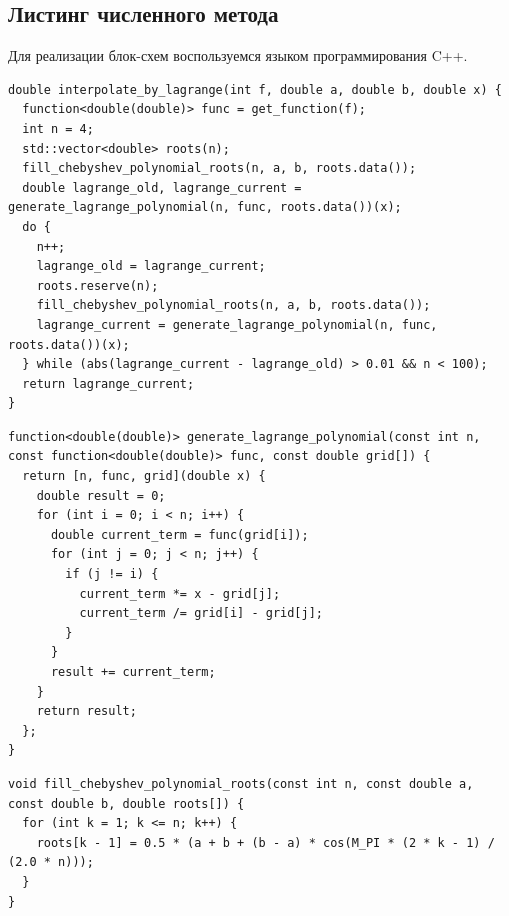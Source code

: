 \subsection{Листинг численного метода}

Для реализации блок-схем воспользуемся языком программирования C++.

\begin{lstlisting}[caption=Вычисление значения интерполирующей функции \( F(x) \) заданной точности.]
double interpolate_by_lagrange(int f, double a, double b, double x) {
  function<double(double)> func = get_function(f);
  int n = 4;
  std::vector<double> roots(n);
  fill_chebyshev_polynomial_roots(n, a, b, roots.data());
  double lagrange_old, lagrange_current = generate_lagrange_polynomial(n, func, roots.data())(x);
  do {
    n++;
    lagrange_old = lagrange_current;
    roots.reserve(n);
    fill_chebyshev_polynomial_roots(n, a, b, roots.data());
    lagrange_current = generate_lagrange_polynomial(n, func, roots.data())(x);
  } while (abs(lagrange_current - lagrange_old) > 0.01 && n < 100);
  return lagrange_current;
}
\end{lstlisting}

\begin{lstlisting}[caption=Построение интерполяционного многочлена в форме Лагранжа \( L_n(t) \).]
function<double(double)> generate_lagrange_polynomial(const int n, const function<double(double)> func, const double grid[]) {
  return [n, func, grid](double x) {
    double result = 0;
    for (int i = 0; i < n; i++) {
      double current_term = func(grid[i]);
      for (int j = 0; j < n; j++) {
        if (j != i) {
          current_term *= x - grid[j];
          current_term /= grid[i] - grid[j];
        }
      }
      result += current_term;
    }
    return result;
  };
}
\end{lstlisting}

\begin{lstlisting}[caption=Поиск корней многочлена Чебышёва первого рода \( T_n(t) \).]
void fill_chebyshev_polynomial_roots(const int n, const double a, const double b, double roots[]) {
  for (int k = 1; k <= n; k++) {
    roots[k - 1] = 0.5 * (a + b + (b - a) * cos(M_PI * (2 * k - 1) / (2.0 * n)));
  }
}
\end{lstlisting}